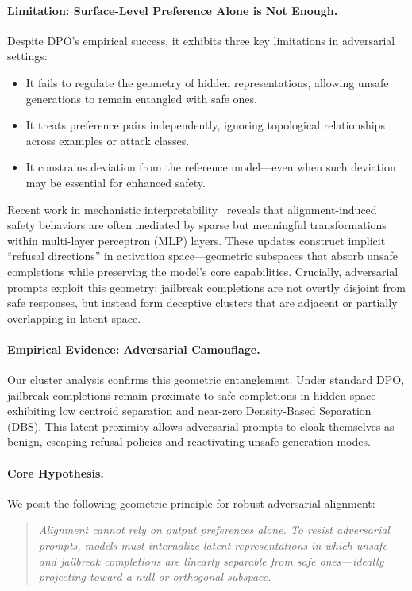 \paragraph{Limitation: Surface-Level Preference Alone is Not Enough.} Despite DPO’s empirical success, it exhibits three key limitations in adversarial settings:
\begin{itemize}
    \item It fails to regulate the geometry of hidden representations, allowing unsafe generations to remain entangled with safe ones.
    \item It treats preference pairs independently, ignoring topological relationships across examples or attack classes.
    \item It constrains deviation from the reference model—even when such deviation may be essential for enhanced safety.
\end{itemize}

Recent work in mechanistic interpretability~\cite{NEURIPS2024_a9bef53e, wei2023jailbroken} reveals that alignment-induced safety behaviors are often mediated by sparse but meaningful transformations within multi-layer perceptron (MLP) layers. These updates construct implicit “refusal directions” in activation space—geometric subspaces that absorb unsafe completions while preserving the model’s core capabilities. Crucially, adversarial prompts exploit this geometry: jailbreak completions are not overtly disjoint from safe responses, but instead form deceptive clusters that are adjacent or partially overlapping in latent space.

\paragraph{Empirical Evidence: Adversarial Camouflage.}
Our cluster analysis confirms this geometric entanglement. Under standard DPO, jailbreak completions remain proximate to safe completions in hidden space—exhibiting low centroid separation and near-zero Density-Based Separation (DBS). This latent proximity allows adversarial prompts to cloak themselves as benign, escaping refusal policies and reactivating unsafe generation modes.

\paragraph{Core Hypothesis.}
We posit the following geometric principle for robust adversarial alignment:

\begin{quote}
    \textit{Alignment cannot rely on output preferences alone. To resist adversarial prompts, models must internalize latent representations in which unsafe and jailbreak completions are linearly separable from safe ones—ideally projecting toward a null or orthogonal subspace.}
\end{quote}


